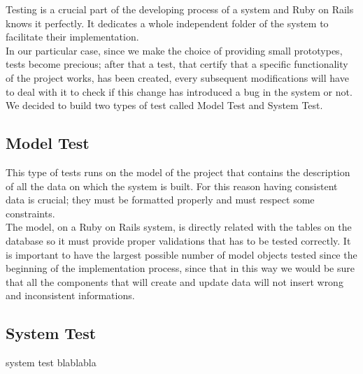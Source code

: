 Testing is a crucial part of the developing process of a system and Ruby on Rails knows it perfectly. It dedicates a whole independent folder of the system to facilitate their implementation. \\
In our particular case, since we make the choice of providing small prototypes, tests become precious; after that a test, that certify that a specific functionality of the project works, has been created, every subsequent modifications will have to deal with it to check if this change has introduced a bug in the system or not. \\
We decided to build two types of test called Model Test and System Test.

\subsection{Model Test}
This type of tests runs on the model of the project that contains the description of all the data on which the system is built. For this reason having consistent data is crucial; they must be formatted properly and must respect some constraints. \\
The model, on a Ruby on Rails system, is directly related with the tables on the database so it must provide proper validations that has to be tested correctly. It is important to have the largest possible number of model objects tested since the beginning of the implementation process, since that in this way we would be sure that all the components that will create and update data will not insert wrong and inconsistent informations. 

\subsection{System Test}
system test blablabla